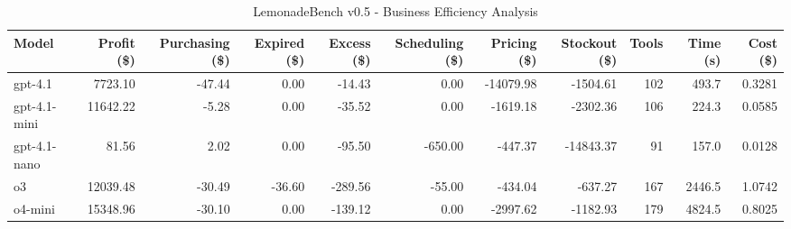 \begin{table}[h]
\centering
\caption{LemonadeBench v0.5 - Business Efficiency Analysis}
\label{tab:lemonadebench_v05_efficiency}
\begin{tabular}{|l|r|r|r|r|r|r|r|r|r|r|}
\hline
\textbf{Model} & \textbf{Profit (\$)} & \textbf{Purchasing (\$)} & \textbf{Expired (\$)} & \textbf{Excess (\$)} & \textbf{Scheduling (\$)} & \textbf{Pricing (\$)} & \textbf{Stockout (\$)} & \textbf{Tools} & \textbf{Time (s)} & \textbf{Cost (\$)} \\
\hline
gpt-4.1 & 7723.10 & -47.44 & 0.00 & -14.43 & 0.00 & -14079.98 & -1504.61 & 102 & 493.7 & 0.3281 \\
\hline
gpt-4.1-mini & 11642.22 & -5.28 & 0.00 & -35.52 & 0.00 & -1619.18 & -2302.36 & 106 & 224.3 & 0.0585 \\
\hline
gpt-4.1-nano & 81.56 & 2.02 & 0.00 & -95.50 & -650.00 & -447.37 & -14843.37 & 91 & 157.0 & 0.0128 \\
\hline
o3 & 12039.48 & -30.49 & -36.60 & -289.56 & -55.00 & -434.04 & -637.27 & 167 & 2446.5 & 1.0742 \\
\hline
o4-mini & 15348.96 & -30.10 & 0.00 & -139.12 & 0.00 & -2997.62 & -1182.93 & 179 & 4824.5 & 0.8025 \\
\hline
\end{tabular}
\end{table}